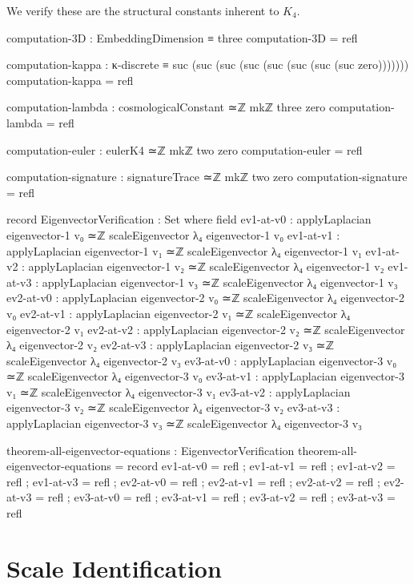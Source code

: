 \documentclass[11pt,a4paper]{book}
\begin{document}
We verify these are the structural constants inherent to $K_4$.

\begin{code}
computation-3D : EmbeddingDimension ≡ three
computation-3D = refl

computation-kappa : κ-discrete ≡ suc (suc (suc (suc (suc (suc (suc (suc zero)))))))
computation-kappa = refl

computation-lambda : cosmologicalConstant ≃ℤ mkℤ three zero
computation-lambda = refl

computation-euler : eulerK4 ≃ℤ mkℤ two zero
computation-euler = refl

computation-signature : signatureTrace ≃ℤ mkℤ two zero
computation-signature = refl

record EigenvectorVerification : Set where
  field
    ev1-at-v0 : applyLaplacian eigenvector-1 v₀ ≃ℤ scaleEigenvector λ₄ eigenvector-1 v₀
    ev1-at-v1 : applyLaplacian eigenvector-1 v₁ ≃ℤ scaleEigenvector λ₄ eigenvector-1 v₁
    ev1-at-v2 : applyLaplacian eigenvector-1 v₂ ≃ℤ scaleEigenvector λ₄ eigenvector-1 v₂
    ev1-at-v3 : applyLaplacian eigenvector-1 v₃ ≃ℤ scaleEigenvector λ₄ eigenvector-1 v₃
    ev2-at-v0 : applyLaplacian eigenvector-2 v₀ ≃ℤ scaleEigenvector λ₄ eigenvector-2 v₀
    ev2-at-v1 : applyLaplacian eigenvector-2 v₁ ≃ℤ scaleEigenvector λ₄ eigenvector-2 v₁
    ev2-at-v2 : applyLaplacian eigenvector-2 v₂ ≃ℤ scaleEigenvector λ₄ eigenvector-2 v₂
    ev2-at-v3 : applyLaplacian eigenvector-2 v₃ ≃ℤ scaleEigenvector λ₄ eigenvector-2 v₃
    ev3-at-v0 : applyLaplacian eigenvector-3 v₀ ≃ℤ scaleEigenvector λ₄ eigenvector-3 v₀
    ev3-at-v1 : applyLaplacian eigenvector-3 v₁ ≃ℤ scaleEigenvector λ₄ eigenvector-3 v₁
    ev3-at-v2 : applyLaplacian eigenvector-3 v₂ ≃ℤ scaleEigenvector λ₄ eigenvector-3 v₂
    ev3-at-v3 : applyLaplacian eigenvector-3 v₃ ≃ℤ scaleEigenvector λ₄ eigenvector-3 v₃

theorem-all-eigenvector-equations : EigenvectorVerification
theorem-all-eigenvector-equations = record
  { ev1-at-v0 = refl
  ; ev1-at-v1 = refl
  ; ev1-at-v2 = refl
  ; ev1-at-v3 = refl
  ; ev2-at-v0 = refl
  ; ev2-at-v1 = refl
  ; ev2-at-v2 = refl
  ; ev2-at-v3 = refl
  ; ev3-at-v0 = refl
  ; ev3-at-v1 = refl
  ; ev3-at-v2 = refl
  ; ev3-at-v3 = refl
  }
\end{code}

\section{Scale Identification}
\end{document}
